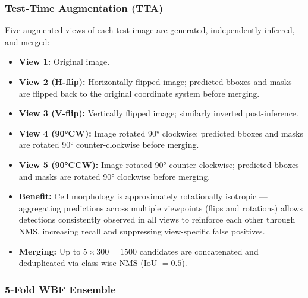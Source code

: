 \documentclass[a4paper]{article} %
\begin{document}
\subsubsection{Test-Time Augmentation (TTA)}

Five augmented views of each test image are generated, independently inferred, and merged:
\begin{itemize}
    \item \textbf{View 1:} Original image.
    \item \textbf{View 2 (H-flip):} Horizontally flipped image; predicted bboxes and masks are flipped back to the original coordinate system before merging.
    \item \textbf{View 3 (V-flip):} Vertically flipped image; similarly inverted post-inference.
    \item \textbf{View 4 (90°CW):} Image rotated 90° clockwise; predicted bboxes and masks are rotated 90° counter-clockwise before merging.
    \item \textbf{View 5 (90°CCW):} Image rotated 90° counter-clockwise; predicted bboxes and masks are rotated 90° clockwise before merging.
    \item \textbf{Benefit:} Cell morphology is approximately rotationally isotropic --- aggregating predictions across multiple viewpoints (flips and rotations) allows detections consistently observed in all views to reinforce each other through NMS, increasing recall and suppressing view-specific false positives.
    \item \textbf{Merging:} Up to $5\times300 = 1500$ candidates are concatenated and deduplicated via class-wise NMS (IoU $= 0.5$).
\end{itemize}

\subsubsection{5-Fold WBF Ensemble}
\end{document}
